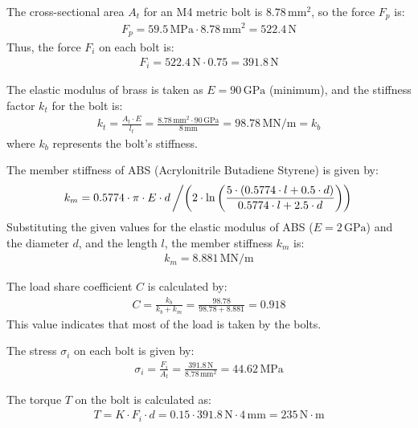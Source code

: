 \documentclass[12pt]{report}
\begin{document}
The cross-sectional area \( A_t \) for an M4 metric bolt is \( 8.78 \, \text{mm}^2 \), so the force \( F_p \) is:
\begin{align}
F_p = 59.5 \, \text{MPa} \cdot 8.78 \, \text{mm}^2 = 522.4 \, \text{N}
\end{align}
Thus, the force \( F_i \) on each bolt is:
\begin{align}
F_i = 522.4 \, \text{N} \cdot 0.75 = 391.8 \, \text{N}
\end{align}

The elastic modulus of brass is taken as \( E = 90 \, \text{GPa} \) (minimum), and the stiffness factor \( k_t \) for the bolt is:
\begin{align}
k_t = \frac{A_t \cdot E}{l_t} = \frac{8.78 \, \text{mm}^2 \cdot 90 \, \text{GPa}}{8 \, \text{mm}} = 98.78 \, \text{MN/m} = k_b
\end{align}
where \( k_b \) represents the bolt's stiffness.

The member stiffness of ABS (Acrylonitrile Butadiene Styrene) is given by:
\begin{align}
k_m = 0.5774 \cdot \pi \cdot E \cdot d \left/ \left( 2 \cdot \ln \left( \frac{5 \cdot (0.5774 \cdot l + 0.5 \cdot d)}{0.5774 \cdot l + 2.5 \cdot d} \right) \right) \right.
\end{align}
Substituting the given values for the elastic modulus of ABS (\( E = 2 \, \text{GPa} \)) and the diameter \( d \), and the length \( l \), the member stiffness \( k_m \) is:
\begin{align}
k_m = 8.881 \, \text{MN/m}
\end{align}

The load share coefficient \( C \) is calculated by:
\begin{align}
C = \frac{k_b}{k_b + k_m} = \frac{98.78}{98.78 + 8.881} = 0.918
\end{align}
This value indicates that most of the load is taken by the bolts.

The stress \( \sigma_i \) on each bolt is given by:
\begin{align}
\sigma_i = \frac{F_i}{A_t} = \frac{391.8 \, \text{N}}{8.78 \, \text{mm}^2} = 44.62 \, \text{MPa}
\end{align}

The torque \( T \) on the bolt is calculated as:
\begin{align}
T = K \cdot F_i \cdot d = 0.15 \cdot 391.8 \, \text{N} \cdot 4 \, \text{mm} = 235 \, \text{N} \cdot \text{m}   
\end{align}
\end{document}
